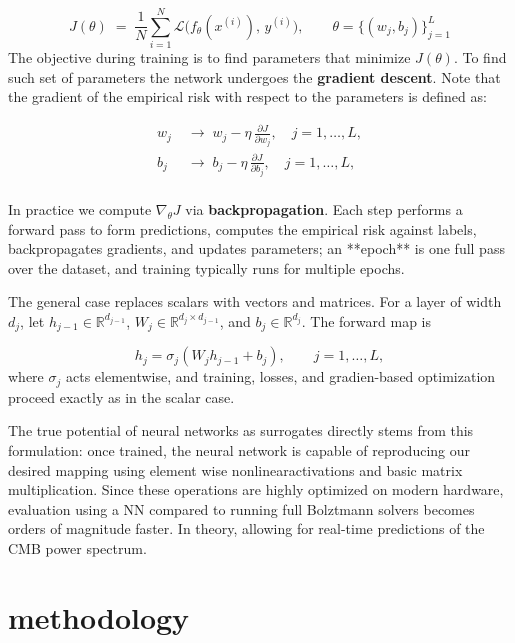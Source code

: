 \documentclass[11pt,a4paper]{article}
\numberwithin{equation}{section}
\begin{document}
$$
J(\theta) \;=\; \frac{1}{N}\sum_{i=1}^N \mathcal{L}\!\big(f_\theta(x^{(i)}),\,y^{(i)}\big),
  \qquad \theta=\{(w_j,b_j)\}_{j=1}^L
$$
The objective during training is to find parameters that minimize $J(\theta)$. To find such set of parameters the network undergoes the \textbf{gradient descent}. Note that the gradient of the empirical risk with respect to the parameters is defined as: 


$$
\begin{aligned}
  w_j &\;\rightarrow\; w_j - \eta\,\frac{\partial J}{\partial w_j}, \quad j=1, \dots,L, 
  \\
  b_j &\;\rightarrow\; b_j - \eta\,\frac{\partial J}{\partial b_j}, \quad j=1, \dots,L,
  \\
\end{aligned}
$$

In practice we compute $\nabla_\theta J$ via \textbf{backpropagation}. Each step performs a forward pass to form predictions, computes the empirical risk against labels, backpropagates gradients, and updates parameters; an **epoch** is one full pass over the dataset, and training typically runs for multiple epochs.

The general case replaces scalars with vectors and matrices. For a layer of width $d_j$, let $h_{j-1}\in\mathbb{R}^{d_{j-1}}$, $W_j\in\mathbb{R}^{d_j\times d_{j-1}}$, and $b_j\in\mathbb{R}^{d_j}$. The forward map is

\begin{equation}
  h_j = \sigma_j\!\left(W_j h_{j-1} + b_j\right), 
  \qquad j = 1, \dots , L ,
\end{equation}
where $\sigma_j$ acts elementwise, and training, losses, and gradien-based optimization proceed exactly as in the scalar case.

The true potential of neural networks as surrogates directly stems from this formulation: once trained, the neural network is capable of reproducing our desired mapping using element wise nonlinearactivations and basic matrix multiplication.
Since these operations are highly optimized on modern hardware, evaluation using a NN compared to running full Bolztmann solvers becomes orders of magnitude faster. In theory, allowing for real-time predictions of the CMB power spectrum.

\subsubsection{}
\section{methodology}
\label{sec:methods}
\end{document}

